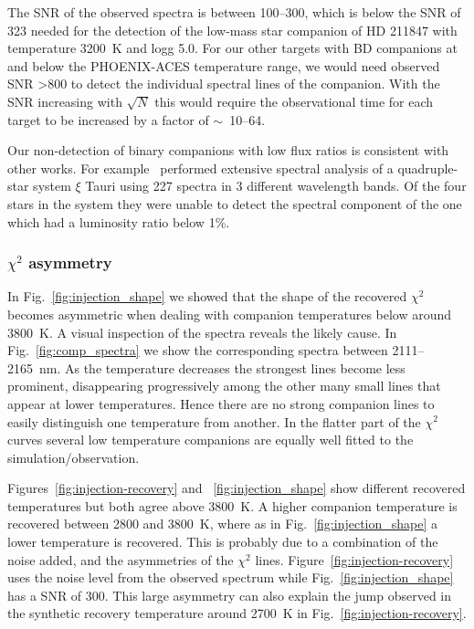 \documentclass[fleqn,usenatbib]{mnras}
\newcommand*\bl{\color{blue}}
\begin{document}

The SNR of the observed spectra is between 100--300, which is below the SNR of 323 needed for the detection of the low-mass star companion of {HD 211847} with temperature 3200~K and logg 5.0. For our other targets with BD companions at and below the PHOENIX-ACES temperature range, we would need observed SNR >800 to detect the individual spectral lines of the companion. With the SNR increasing with \(\sqrt{N}\) this would require the observational time for each target to be increased by a factor of \(\sim\)~10--64.

Our non-detection of binary companions with low flux ratios is consistent with other works. For example~\citet{nemravova_xtauri_2016} performed extensive spectral analysis of a quadruple-star system {$\xi$ Tauri} using 227 spectra in 3 different wavelength bands. Of the four stars in the system they were unable to detect the spectral component of the one which had a luminosity ratio below 1\%.



\subsubsection{\(\chi^2\) asymmetry} 
\label{subsubsec:chi2_assymetry}
In Fig.~\ref{fig:injection_shape} we showed that the shape of the recovered \(\chi^2\) becomes asymmetric when dealing with companion temperatures below around 3800~K. A visual inspection of the spectra reveals the likely cause. In Fig.~\ref{fig:comp_spectra} we show the corresponding spectra between 2111--2165~nm. As the temperature decreases the strongest lines become less prominent, disappearing progressively among the other many small lines that appear at lower temperatures. Hence there are no strong companion lines to easily distinguish one temperature from another. In the flatter part of the \(\chi^2\) curves several low temperature companions are equally well fitted to the simulation/observation.

Figures~\ref{fig:injection-recovery} and ~\ref{fig:injection_shape} show different recovered temperatures but both agree above 3800~K. A higher companion temperature is recovered between 2800 and 3800~K, where as in Fig.~\ref{fig:injection_shape} a lower temperature is recovered. This is probably due to a combination of the noise added, and the asymmetries of the \(\chi^2\) lines. Figure~\ref{fig:injection-recovery} uses the noise level from the observed spectrum while Fig.~\ref{fig:injection_shape} has a SNR of 300.
This large asymmetry can also explain the jump observed in the synthetic recovery temperature around 2700~K in Fig.~\ref{fig:injection-recovery}.
\end{document}
